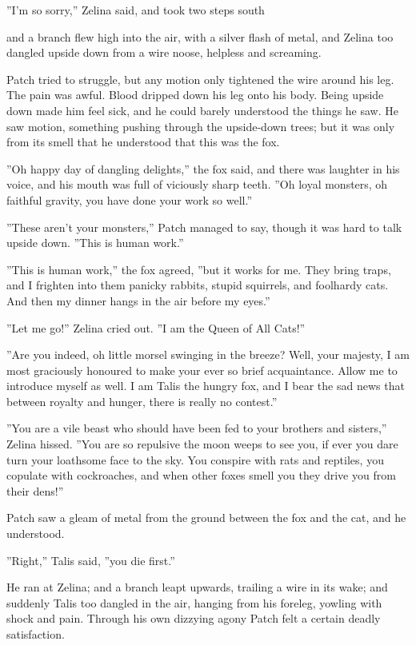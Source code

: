 \documentclass[12pt]{book}
\begin{document}
''I'm so sorry,'' Zelina said, and took two steps south %

and a branch flew high into the air, with a silver flash of metal, and Zelina too dangled upside down from a wire noose, helpless and screaming.

Patch tried to struggle, but any motion only tightened the wire around his leg. The pain was awful. Blood dripped down his leg onto his body. Being upside down made him feel sick, and he could barely understood the things he saw. He saw motion, something pushing through the upside-down trees; but it was only from its smell that he understood that this was the fox.

''Oh happy day of dangling delights,'' the fox said, and there was laughter in his voice, and his mouth was full of viciously sharp teeth. ''Oh loyal monsters, oh faithful gravity, you have done your work so well.''

''These aren't your monsters,'' Patch managed to say, though it was hard to talk upside down. ''This is human work.''

''This is human work,'' the fox agreed, ''but it works for me. They bring traps, and I frighten into them panicky rabbits, stupid squirrels, and foolhardy cats. And then my dinner hangs in the air before my eyes.''

''Let me go!'' Zelina cried out. ''I am the Queen of All Cats!''

''Are you indeed, oh little morsel swinging in the breeze? Well, your majesty, I am most graciously honoured to make your ever so brief acquaintance. Allow me to introduce myself as well. I am Talis the hungry fox, and I bear the sad news that between royalty and hunger, there is really no contest.''

''You are a vile beast who should have been fed to your brothers and sisters,'' Zelina hissed. ''You are so repulsive the moon weeps to see you, if ever you dare turn your loathsome face to the sky. You conspire with rats and reptiles, you copulate with cockroaches, and when other foxes smell you they drive you from their dens!''

Patch saw a gleam of metal from the ground between the fox and the cat, and he understood.

''Right,'' Talis said, ''you die first.''

He ran at Zelina; and a branch leapt upwards, trailing a wire in its wake; and suddenly Talis too dangled in the air, hanging from his foreleg, yowling with shock and pain. Through his own dizzying agony Patch felt a certain deadly satisfaction.
\end{document}
